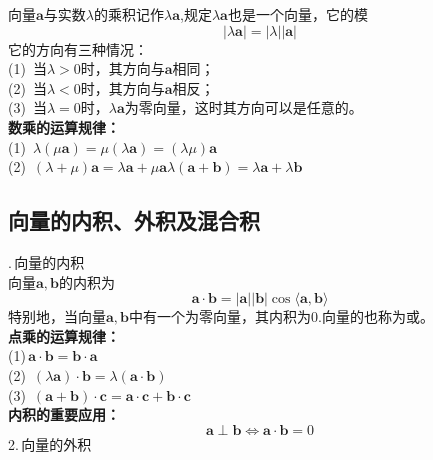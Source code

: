 \sj \sj
{}
向量$\boldsymbol{a}$与实数$\lambda$的乘积记作$\lambda\boldsymbol{a}$,规定$\lambda\boldsymbol{a}$也是一个向量，它的模
\begin{equation}
	|\lambda\boldsymbol{a}|=|\lambda||\boldsymbol{a}|
\end{equation}
它的方向有三种情况：\\
(1)$\,$ 当$\lambda>0$时，其方向与$\boldsymbol{a}$相同；\\
(2)$\,$ 当$\lambda<0$时，其方向与$\boldsymbol{a}$相反；\\
(3)$\,$ 当$\lambda=0$时，$\lambda\boldsymbol{a}$为零向量，这时其方向可以是任意的。\\
\textbf{数乘的运算规律：}\\
(1)$\,$  \qquad
$\lambda(\mu\boldsymbol{a})=\mu(\lambda\boldsymbol{a})=(\lambda\mu)\boldsymbol{a}$\\
(2)$\,$  \qquad
$(\lambda+\mu)\boldsymbol{a}=\lambda\boldsymbol{a}+\mu \boldsymbol{a}$\qquad $\lambda(\boldsymbol{a}+\boldsymbol{b})=\lambda\boldsymbol{a}+\lambda\boldsymbol{b}$
\subsection{向量的内积、外积及混合积}
.$\,$向量的内积\\

\sj\sj
{}
向量$\boldsymbol{a},\boldsymbol{b}$的内积为
\begin{equation}
	\boldsymbol{a}\cdot\boldsymbol{b}=|\boldsymbol{a}||\boldsymbol{b}|\cos\langle\boldsymbol{a},\boldsymbol{b}\rangle
\end{equation}
特别地，当向量$\boldsymbol{a},\boldsymbol{b}$中有一个为零向量，其内积为0.向量的也称为或。\\
\textbf{点乘的运算规律：}\\
(1)$\,$\qquad $\boldsymbol{a}\cdot\boldsymbol{b}=\boldsymbol{b}\cdot\boldsymbol{a}$\\
(2)$\,$\qquad
$(\lambda\boldsymbol{a})\cdot\boldsymbol{b}=\lambda(\boldsymbol{a}\cdot\boldsymbol{b})$\\
(3)$\,$\qquad
$(\boldsymbol{a}+\boldsymbol{b})\cdot\boldsymbol{c}=\boldsymbol{a}\cdot\boldsymbol{c}+\boldsymbol{b}\cdot\boldsymbol{c}$\\
\textbf{内积的重要应用：}
\begin{equation}
	\boldsymbol{a}\perp\boldsymbol{b}\Leftrightarrow \boldsymbol{a}\cdot\boldsymbol{b}=0 
\end{equation}
2.$\,$向量的外积\\

